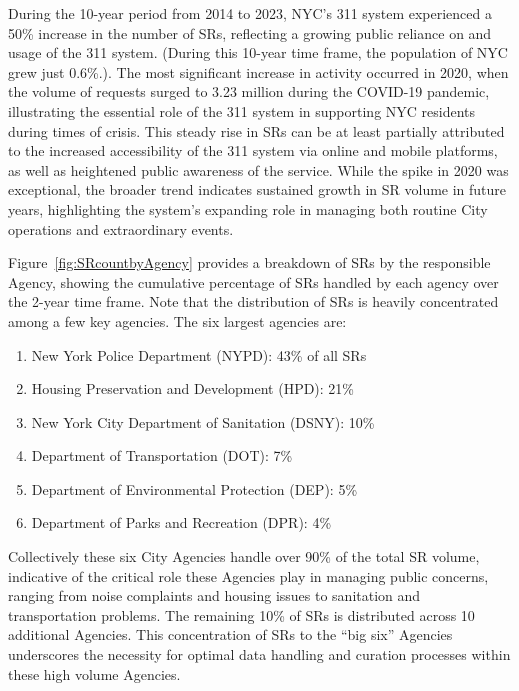 \documentclass[linenumber]{jdsart}
\begin{document}
During the 10-year period from 2014 to 2023,  NYC's 311 system
experienced a 50\% increase in the number of SRs, 
reflecting a growing public reliance on and usage of 
the 311 system. (During this 10-year time frame, the 
population of NYC grew just 0.6\%.). The most significant increase
in activity occurred in 2020, when the volume of requests 
surged to 3.23 million during the COVID-19 pandemic, 
illustrating the essential role of the 311 system in supporting 
NYC residents during times of crisis. This steady 
rise in SRs can be at least partially attributed to the increased 
accessibility of the 311 system via online and mobile 
platforms, as well as heightened public awareness of the service. 
While the spike in 2020 was exceptional, the broader trend 
indicates sustained growth in SR volume in future years,  
highlighting the system's expanding role in managing 
both routine City operations and extraordinary events.



Figure~\ref{fig:SRcountbyAgency} provides a breakdown of SRs by
the responsible Agency, showing the cumulative 
percentage of SRs handled by each
agency over the 2-year time frame. Note that the
distribution of SRs is heavily concentrated among a few key 
agencies. The six largest agencies are:

\begin{enumerate}[left=1.5em]
    \item New York Police Department (NYPD): 43\% of all SRs
    \item Housing Preservation and Development (HPD): 21\%
    \item New York City Department of Sanitation (DSNY): 10\%
    \item Department of Transportation (DOT): 7\%
    \item Department of Environmental Protection (DEP): 5\%
    \item Department of Parks and Recreation (DPR): 4\%
\end{enumerate}


Collectively these six City Agencies handle over 90\% of the total SR 
volume, indicative of the critical role these Agencies play in managing
public concerns, ranging from noise complaints and housing issues to
sanitation and transportation problems. The remaining
10\% of SRs is distributed across 10 additional Agencies. 
This concentration of SRs to the ``big six'' Agencies 
underscores the necessity for optimal data handling and 
curation processes within these  high volume Agencies.
\end{document}
